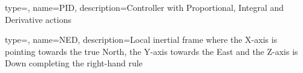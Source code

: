 {
	type=\acronymtype,
	name={PID},
	description={Controller with Proportional, Integral and Derivative actions}
}

{
	type=\acronymtype,
	name={NED},
	description={Local inertial frame where the X-axis is pointing towards the true North, the Y-axis towards the East and the Z-axis is Down completing the right-hand rule}
}

